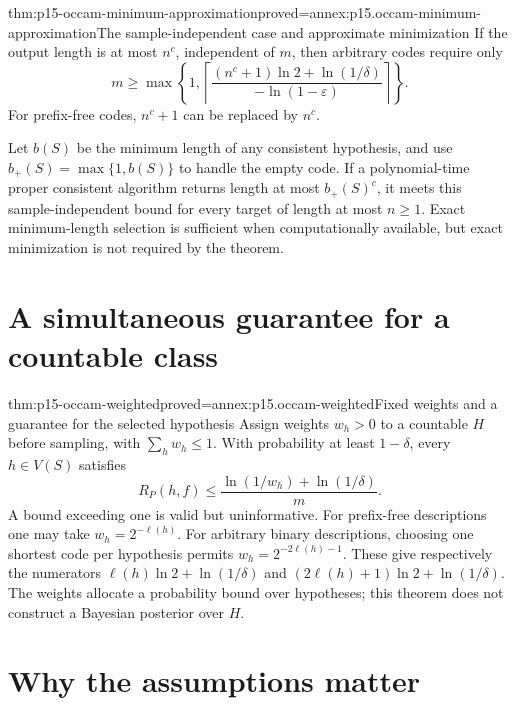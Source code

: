 \begin{hbtheorem}{thm:p15-occam-minimum-approximation}{proved=annex:p15.occam-minimum-approximation}{The sample-independent case and approximate minimization}
If the output length is at most \(n^c\), independent of \(m\),
then arbitrary codes require only
\[
 m\geq\max\left\{1,\left\lceil
       \frac{(n^c+1)\ln2+\ln(1/\delta)}{-\ln(1-\varepsilon)}
                                      \right\rceil\right\}.
\]
For prefix-free codes, \(n^c+1\) can be replaced by \(n^c\).

Let \(b(S)\) be the minimum length of any consistent hypothesis,
and use \(b_+(S)=\max\{1,b(S)\}\) to handle the empty code.
If a polynomial-time proper consistent algorithm returns length
at most \(b_+(S)^c\), it meets this sample-independent bound
for every target of length at most \(n\geq1\).
Exact minimum-length selection is sufficient when computationally
available, but exact minimization is not required by the theorem.
\end{hbtheorem}

\section{A simultaneous guarantee for a countable class}

\begin{hbtheorem}{thm:p15-occam-weighted}{proved=annex:p15.occam-weighted}{Fixed weights and a guarantee for the selected hypothesis}
Assign weights \(w_h>0\) to a countable \(H\) before sampling,
with \(\sum_h w_h\leq1\). With probability at least \(1-\delta\),
every \(h\in V(S)\) satisfies
\[
 R_P(h,f)\leq
      \frac{\ln(1/w_h)+\ln(1/\delta)}m.
\]
A bound exceeding one is valid but uninformative.
For prefix-free descriptions one may take \(w_h=2^{-\ell(h)}\).
For arbitrary binary descriptions, choosing one shortest code
per hypothesis permits \(w_h=2^{-2\ell(h)-1}\).
These give respectively the numerators
\(\ell(h)\ln2+\ln(1/\delta)\) and
\((2\ell(h)+1)\ln2+\ln(1/\delta)\).
The weights allocate a probability bound over hypotheses; this
theorem does not construct a Bayesian posterior over \(H\).
\end{hbtheorem}

\section{Why the assumptions matter}

